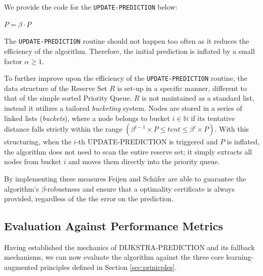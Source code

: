 We provide the code for the \texttt{UPDATE-PREDICTION} below:
\vspace{0.5cm}

\begin{algorithm}[H]
\caption{UPDATE-PREDICTION()} \label{alg:update_routine}
$P = \beta \cdot P$ 
 {
}
\end{algorithm}
\vspace{0.5cm}

The \texttt{UPDATE-PREDICTION} routine should not happen too often as it reduces the efficiency of the algorithm. Therefore, the initial prediction is inflated by a small factor $\alpha \ge 1$.

To further improve upon the efficiency of the \texttt{UPDATE-PREDICTION} routine, the data structure of the Reserve Set $R$ is set-up in a specific manner, different to that of the simple sorted Priority Queue. $R$ is not maintained as a standard list, instead it utilizes a tailored \textit{bucketing} system. Nodes are stored in a series of linked lists (\textit{buckets}), where a node belongs to bucket $i \in \mathbb{N}$ if its tentative distance falls strictly within the range $(\beta^{i-1} \times P \le tent \le \beta^i \times P)$. With this structuring, when the $i$-th \textsc{UPDATE-PREDICTION} is triggered and $P$ is inflated, the algorithm does not need to scan the entire reserve set; it simply extracts all nodes from bucket $i$ and moves them directly into the priority queue.

By implementing these measures Feijen and Schäfer are able to guarantee the algorithm's $\beta$-robustness and ensure that a optimality certificate is always provided, regardless of the the error on the prediction.

\subsection{Evaluation Against Performance Metrics}
\label{subsec:eval_metrics}

Having established the mechanics of \textsc{DIJKSTRA-PREDICTION} and its fallback mechanisms, we can now evaluate the algorithm against the three core learning-augmented principles defined in Section \ref{sec:prinicples}.

